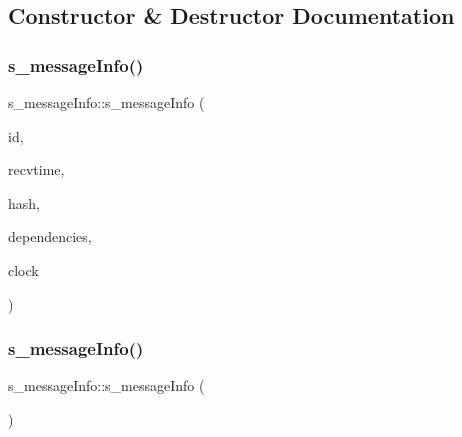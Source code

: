 \subsection{Constructor \& Destructor Documentation}
\mbox{\label{structs__messageInfo_aa626a79c3b41f14b406f8d86b87fcfb9}} 
\subsubsection{\texorpdfstring{s\+\_\+message\+Info()}{s\_messageInfo()}\hspace{0.1cm}{\footnotesize\ttfamily [1/2]}}
{\footnotesize\ttfamily s\+\_\+message\+Info\+::s\+\_\+message\+Info (\begin{DoxyParamCaption}\item[{\hyperlink{structures_8h_a83a1d9a070efa5341da84cfd8e28d3e5}{id\+Msg}}]{id,  }\item[{omnetpp\+::simtime\+\_\+t}]{recvtime,  }\item[{size\+\_\+t}]{hash,  }\item[{vector$<$ \hyperlink{structures_8h_a83a1d9a070efa5341da84cfd8e28d3e5}{id\+Msg} $>$}]{dependencies,  }\item[{\hyperlink{classProbabilisticClock}{Probabilistic\+Clock}}]{clock }\end{DoxyParamCaption})\hspace{0.3cm}{\ttfamily [inline]}}

\mbox{\label{structs__messageInfo_a4cde6289906418221236646ae3df77c8}} 
\subsubsection{\texorpdfstring{s\+\_\+message\+Info()}{s\_messageInfo()}\hspace{0.1cm}{\footnotesize\ttfamily [2/2]}}
{\footnotesize\ttfamily s\+\_\+message\+Info\+::s\+\_\+message\+Info (\begin{DoxyParamCaption}{ }\end{DoxyParamCaption})\hspace{0.3cm}{\ttfamily [inline]}}



